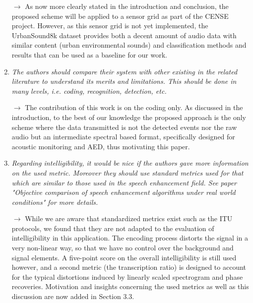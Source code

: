 \documentclass[10pt]{article}
\begin{document}
\begin{enumerate}
$\rightarrow$ As now more clearly stated in the introduction and conclusion, the proposed scheme will be applied to a sensor grid as part of the CENSE project. However, as this sensor grid is not yet implemented, the UrbanSound8k dataset provides both a decent amount of audio data with similar content (urban environmental sounds) and classification methods and results that can be used as a baseline for our work.

\item \emph{The authors should compare their system with other existing in the related literature to understand its merits and limitations. This should be done in many levels, i.e. coding, recognition, detection, etc.}

$\rightarrow$ The contribution of this work is on the coding only. As discussed in the introduction, to the best of our knowledge the proposed approach is the only scheme where the data transmitted is not the detected events nor the raw audio but an intermediate spectral based format, specifically designed for acoustic monitoring and AED, thus motivating this paper.

\item \emph{Regarding intelligibility, it would be nice if the authors gave more information on the used metric. Moreover they should use standard metrics used for that which are similar to those used in the speech enhancement field. See paper "Objective comparison of speech enhancement algorithms under real world conditions" for more details.}

$\rightarrow$ While we are aware that standardized metrics exist such as the ITU protocols, we found that they are not adapted to the evaluation of intelligibility in this application. The encoding process distorts the signal in a very non-linear way, so that we have no control over the background and signal elements. A five-point score on the overall intelligibility is still used however, and a second metric (the transcription ratio) is designed to account for the typical distortions induced by linearly scaled spectrogram and phase recoveries. Motivation and insights concerning the used metrics as well as this discussion are now added in Section 3.3.

\end{enumerate}
\end{document}
